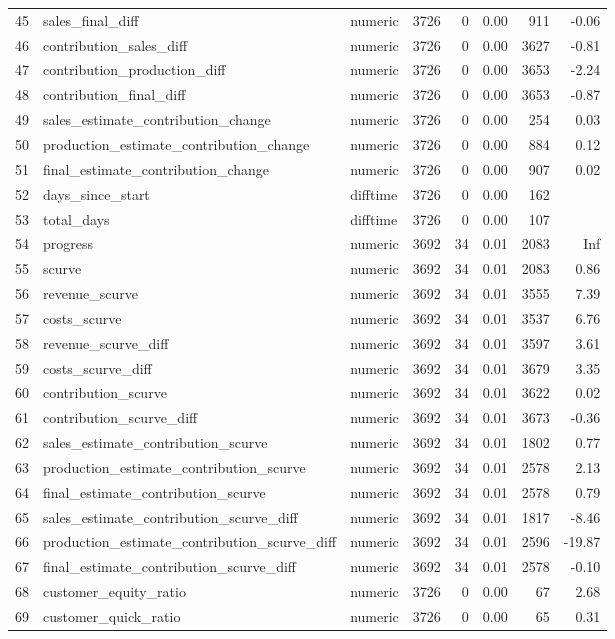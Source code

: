 \begin{sidewaystable}[ht]
\begin{tabular}{rllrrrrr}
  45 & sales\_final\_diff & numeric & 3726 &   0 & 0.00 & 911 & -0.06 \\ 
  46 & contribution\_sales\_diff & numeric & 3726 &   0 & 0.00 & 3627 & -0.81 \\ 
  47 & contribution\_production\_diff & numeric & 3726 &   0 & 0.00 & 3653 & -2.24 \\ 
  48 & contribution\_final\_diff & numeric & 3726 &   0 & 0.00 & 3653 & -0.87 \\ 
  49 & sales\_estimate\_contribution\_change & numeric & 3726 &   0 & 0.00 & 254 & 0.03 \\ 
  50 & production\_estimate\_contribution\_change & numeric & 3726 &   0 & 0.00 & 884 & 0.12 \\ 
  51 & final\_estimate\_contribution\_change & numeric & 3726 &   0 & 0.00 & 907 & 0.02 \\ 
  52 & days\_since\_start & difftime & 3726 &   0 & 0.00 & 162 &  \\ 
  53 & total\_days & difftime & 3726 &   0 & 0.00 & 107 &  \\ 
  54 & progress & numeric & 3692 &  34 & 0.01 & 2083 & Inf \\ 
  55 & scurve & numeric & 3692 &  34 & 0.01 & 2083 & 0.86 \\ 
  56 & revenue\_scurve & numeric & 3692 &  34 & 0.01 & 3555 & 7.39 \\ 
  57 & costs\_scurve & numeric & 3692 &  34 & 0.01 & 3537 & 6.76 \\ 
  58 & revenue\_scurve\_diff & numeric & 3692 &  34 & 0.01 & 3597 & 3.61 \\ 
  59 & costs\_scurve\_diff & numeric & 3692 &  34 & 0.01 & 3679 & 3.35 \\ 
  60 & contribution\_scurve & numeric & 3692 &  34 & 0.01 & 3622 & 0.02 \\ 
  61 & contribution\_scurve\_diff & numeric & 3692 &  34 & 0.01 & 3673 & -0.36 \\ 
  62 & sales\_estimate\_contribution\_scurve & numeric & 3692 &  34 & 0.01 & 1802 & 0.77 \\ 
  63 & production\_estimate\_contribution\_scurve & numeric & 3692 &  34 & 0.01 & 2578 & 2.13 \\ 
  64 & final\_estimate\_contribution\_scurve & numeric & 3692 &  34 & 0.01 & 2578 & 0.79 \\ 
  65 & sales\_estimate\_contribution\_scurve\_diff & numeric & 3692 &  34 & 0.01 & 1817 & -8.46 \\ 
  66 & production\_estimate\_contribution\_scurve\_diff & numeric & 3692 &  34 & 0.01 & 2596 & -19.87 \\ 
  67 & final\_estimate\_contribution\_scurve\_diff & numeric & 3692 &  34 & 0.01 & 2578 & -0.10 \\ 
  68 & customer\_equity\_ratio & numeric & 3726 &   0 & 0.00 &  67 & 2.68 \\ 
  69 & customer\_quick\_ratio & numeric & 3726 &   0 & 0.00 &  65 & 0.31 \\ 
   \hline
\end{tabular}
\end{sidewaystable}
